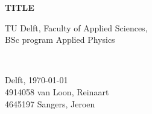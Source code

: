 \begin{titlepage}

\newcommand{\HRule}{\rule{\linewidth}{0.5mm}} %

\center


{ \huge \bfseries TITLE}\\[1cm] %






\vfill
\begin{minipage}{0.4\textwidth}
    \begin{flushleft}
        TU Delft, Faculty of Applied Sciences,\\
        BSc program Applied Physics
    \end{flushleft}
\end{minipage}
~
\begin{minipage}{0.4\textwidth}
    \begin{flushright}
        Delft, \today \\
        4914058 \hspace{1cm} van Loon, Reinaart\\
        4645197 \hspace{1cm} Sangers, Jeroen
    \end{flushright}
\end{minipage}\\[1.5cm]


\end{titlepage}
